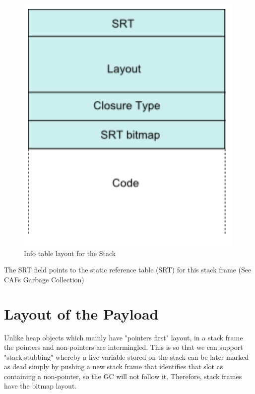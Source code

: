 \documentclass[a4paper,11pt]{article}
\begin{document}
\begin{figure}
    \centering
    \includegraphics[width=\linewidth]{GHC RTS Notes/Storage/images/stack_info.png}
    \caption{Info table layout for the Stack}
    \label{fig:my_label}
\end{figure}

The SRT field points to the static reference table (SRT) for this stack frame (See CAFs Garbage Collection)

\section{Layout of the Payload}

Unlike heap objects which mainly have "pointers first" layout, in a stack frame the pointers and non-pointers are intermingled.  This is so that we can support "stack stubbing" whereby a live variable stored on the stack can be later marked as dead simply by pushing a new stack frame that identifies that slot as containing a non-pointer, so the GC will not follow it. Therefore, stack frames have the bitmap layout.
\end{document}
